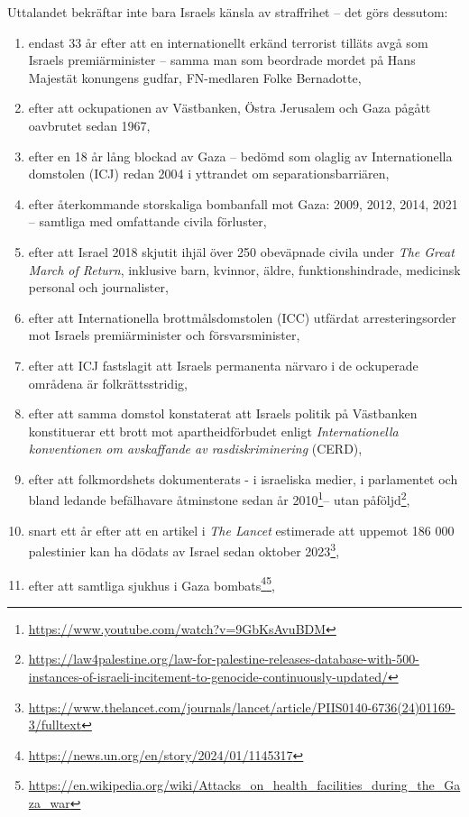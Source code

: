 \documentclass[12pt]{article}
\begin{document}
Uttalandet bekräftar inte bara Israels känsla av straffrihet – det görs dessutom:
\begin{enumerate}
\item endast 33 år efter att en internationellt erkänd terrorist tilläts avgå som Israels premiärminister – samma man som beordrade mordet på Hans Majestät konungens gudfar, FN-medlaren Folke Bernadotte,
\item efter att ockupationen av Västbanken, Östra Jerusalem och Gaza pågått oavbrutet sedan 1967,
\item efter en 18 år lång blockad av Gaza – bedömd som olaglig av Internationella domstolen (ICJ) redan 2004 i yttrandet om separationsbarriären,
\item efter återkommande storskaliga bombanfall mot Gaza: 2009, 2012, 2014, 2021 – samtliga med omfattande civila förluster,
\item efter att Israel 2018 skjutit ihjäl över 250 obeväpnade civila under \textit{The Great March of Return}, inklusive barn, kvinnor, äldre, funktionshindrade, medicinsk personal och journalister,
\item efter att Internationella brottmålsdomstolen (ICC) utfärdat arresteringsorder mot Israels premiärminister och försvarsminister,
\item efter att ICJ fastslagit att Israels permanenta närvaro i de ockuperade områdena är folkrättsstridig,
\item efter att samma domstol konstaterat att Israels politik på Västbanken konstituerar ett brott mot apartheidförbudet enligt \textit{Internationella konventionen om avskaffande av rasdiskriminering} (CERD),
\item efter att folkmordshets dokumenterats - i israeliska medier, i parlamentet och bland ledande befälhavare åtminstone sedan år 2010\footnote{\url{https://www.youtube.com/watch?v=9GbKsAvuBDM}}– utan påföljd\footnote{\url{https://law4palestine.org/law-for-palestine-releases-database-with-500-instances-of-israeli-incitement-to-genocide-continuously-updated/}},
\item snart ett år efter att en artikel i \textit{The Lancet} estimerade att uppemot 186 000 palestinier kan ha dödats av Israel sedan oktober 2023\footnote{\url{https://www.thelancet.com/journals/lancet/article/PIIS0140-6736(24)01169-3/fulltext}},
\item efter att samtliga sjukhus i Gaza bombats\footnote{\url{https://news.un.org/en/story/2024/01/1145317}}\footnote{\url{https://en.wikipedia.org/wiki/Attacks_on_health_facilities_during_the_Gaza_war}},

\end{enumerate}
\end{document}
